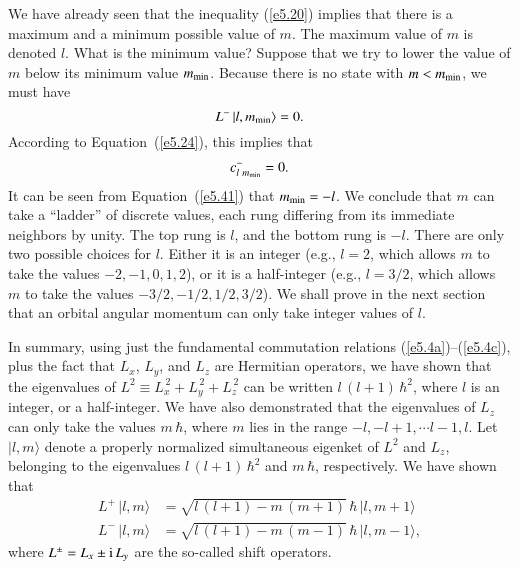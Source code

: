 We have already seen that the inequality (\ref{e5.20}) implies that there is a
maximum and a minimum possible value of $m$. The maximum value of $m$
is denoted $l$. What is the minimum value? Suppose that we try
to lower the value of $m$ below its minimum value $m_{\rm min}$. Because 
there is no state with $m<m_{\rm min}$, we must have
\begin{equation}
L^- \,|l, m_{\rm min}\rangle = 0.
\end{equation}
According to Equation~(\ref{e5.24}), this implies that
\begin{equation}
c_{l\,\, m_{\rm min}}^- = 0.
\end{equation}
It can be seen from Equation~(\ref{e5.41})  that $m_{\rm min} = -l$. 
We conclude that $m$ can take a ``ladder'' of discrete values, each rung differing
from its immediate neighbors by unity. The top rung is $l$, and the
bottom rung is  $-l$. There are only two possible choices for $l$.
Either it is an integer ({\rm e.g.}, $l=2$, which  allows $m$ to take the values
$-2, -1, 0, 1, 2$), or it is a half-integer ({\rm e.g.}, $l=3/2$, which  allows
$m$ to take the values $-3/2, -1/2, 1/2, 3/2$). We shall prove in the next
section that an orbital angular momentum can only take integer values
of $l$. 

In summary, using  just  the fundamental commutation relations (\ref{e5.4a})--(\ref{e5.4c}),
plus the fact that $L_x$, $L_y$, and $L_z$ are Hermitian operators, we have
shown that the eigenvalues of $L^2\equiv L_x^{\,2} + L_y^{\,2}+L_z^{\,2}$
can be written $l\,(l+1)\,\hbar^2$, where $l$ is an integer, or a half-integer. 
We have also demonstrated that the eigenvalues of $L_z$ can only
take the values $m\,\hbar$, where $m$ lies in the range $-l, -l+1,\cdots
l-1, l$. Let $|l, m\rangle$ denote a properly normalized simultaneous eigenket
of $L^2$ and $L_z$, belonging to the eigenvalues $l\,(l+1)\,\hbar^2$
and $m\,\hbar$, respectively.
We have shown that 
\begin{align}\label{e5.44a}
L^+ \,|l, m\rangle &= \sqrt{l\,(l+1)-m\,(m+1)}\,\hbar\,|l, m+1\rangle\\[0.5ex]
L^- \,|l,m \rangle &= \sqrt{l\,(l+1)-m\,(m-1)}\,\hbar\,|l, m-1\rangle,\label{e5.44b}
\end{align}
where $L^\pm = L_x \pm {\rm i} \,L_y$ are the so-called shift operators.


